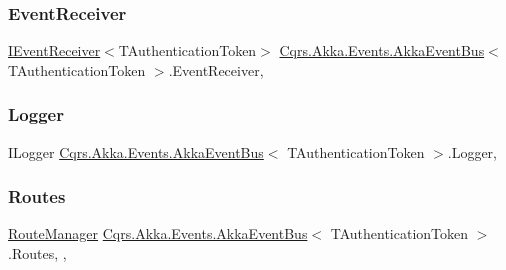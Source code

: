 \subsubsection{\texorpdfstring{Event\+Receiver}{EventReceiver}}
{\footnotesize\ttfamily \hyperlink{interfaceCqrs_1_1Events_1_1IEventReceiver}{I\+Event\+Receiver}$<$T\+Authentication\+Token$>$ \hyperlink{classCqrs_1_1Akka_1_1Events_1_1AkkaEventBus}{Cqrs.\+Akka.\+Events.\+Akka\+Event\+Bus}$<$ T\+Authentication\+Token $>$.Event\+Receiver\hspace{0.3cm}{\ttfamily [get]}, {\ttfamily [protected]}}

\mbox{\label{classCqrs_1_1Akka_1_1Events_1_1AkkaEventBus_a0bbdde7f2011707581db6a66cd73c5c4_a0bbdde7f2011707581db6a66cd73c5c4}} 
\subsubsection{\texorpdfstring{Logger}{Logger}}
{\footnotesize\ttfamily I\+Logger \hyperlink{classCqrs_1_1Akka_1_1Events_1_1AkkaEventBus}{Cqrs.\+Akka.\+Events.\+Akka\+Event\+Bus}$<$ T\+Authentication\+Token $>$.Logger\hspace{0.3cm}{\ttfamily [get]}, {\ttfamily [protected]}}

\mbox{\label{classCqrs_1_1Akka_1_1Events_1_1AkkaEventBus_a22f195a654564335ffa5f6df01b8af8d_a22f195a654564335ffa5f6df01b8af8d}} 
\subsubsection{\texorpdfstring{Routes}{Routes}}
{\footnotesize\ttfamily \hyperlink{classCqrs_1_1Bus_1_1RouteManager}{Route\+Manager} \hyperlink{classCqrs_1_1Akka_1_1Events_1_1AkkaEventBus}{Cqrs.\+Akka.\+Events.\+Akka\+Event\+Bus}$<$ T\+Authentication\+Token $>$.Routes\hspace{0.3cm}{\ttfamily [static]}, {\ttfamily [get]}, {\ttfamily [protected]}}

